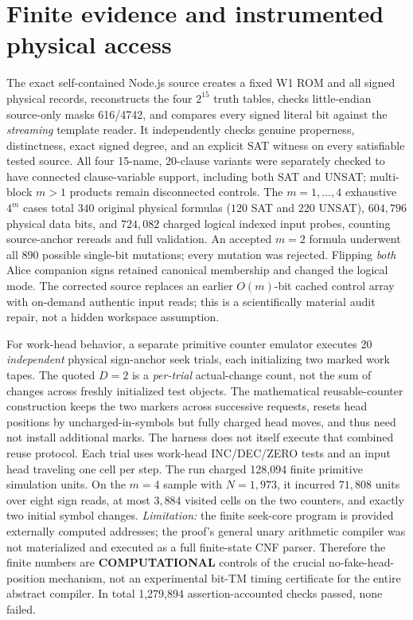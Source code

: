 \documentclass[11pt]{article}
\begin{document}
\section{Finite evidence and instrumented physical access}
The exact self-contained Node.js source creates a fixed
W1 ROM and all signed physical records, reconstructs
the four $2^{15}$ truth tables, checks little-endian
source-only masks 616/4742, and compares every
signed literal bit against the \emph{streaming} template
reader. It independently checks genuine properness,
distinctness, exact signed degree, and an explicit
SAT witness on every satisfiable tested source.
All four 15-name, 20-clause variants were separately checked to have connected clause-variable support, including both SAT and UNSAT; multi-block $m>1$ products remain disconnected controls. The $m=1,\ldots,4$ exhaustive $4^m$ cases total
$340$ original physical formulas ($120$ SAT and
$220$ UNSAT), $604{,}796$ physical data bits,
and $724{,}082$ charged logical indexed input probes,
counting source-anchor rereads and full validation.
An accepted $m=2$ formula underwent all $890$
possible single-bit mutations; every mutation
was rejected. Flipping \emph{both} Alice companion
signs retained canonical membership and changed
the logical mode. The corrected source replaces
an earlier $O(m)$-bit cached control array with
on-demand authentic input reads; this is a
scientifically material audit repair, not a hidden
workspace assumption.

For work-head behavior, a separate primitive counter
emulator executes 20 \emph{independent} physical sign-anchor
seek trials, each initializing two marked work tapes. The quoted
$D=2$ is a \emph{per-trial} actual-change count, not the
sum of changes across freshly initialized test objects.
The mathematical reusable-counter construction keeps the two
markers across successive requests, resets head positions by
uncharged-in-symbols but fully charged head moves, and thus
need not install additional marks. The harness does not itself
execute that combined reuse protocol. Each trial uses
work-head INC/DEC/ZERO tests and an input head traveling
one cell per step. The run charged 128,094 finite
primitive simulation units. On the $m=4$ sample with
$N=1{,}973$, it incurred $71{,}808$ units over
eight sign reads, at most $3{,}884$ visited cells on
the two counters, and exactly two initial symbol
changes. \emph{Limitation:} the finite seek-core
program is provided externally computed addresses;
the proof's general unary arithmetic compiler was
not materialized and executed as a full finite-state
CNF parser. Therefore the finite numbers are
\textbf{COMPUTATIONAL} controls of the crucial
no-fake-head-position mechanism, not an experimental
bit-TM timing certificate for the entire abstract
compiler. In total 1,279,894 assertion-accounted
checks passed, none failed.
\end{document}
